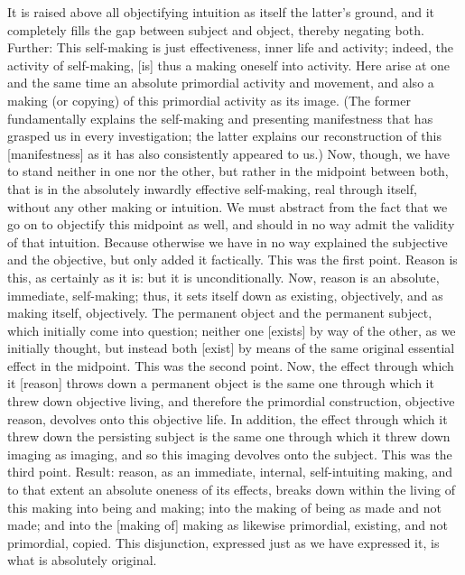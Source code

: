 It is raised above all objectifying intuition
as itself the latter’s ground,
and it completely fills the gap
between subject and object,
thereby negating both.
Further:
This self-making is just effectiveness,
inner life and activity;
indeed, the activity of self-making, [is]
thus a making oneself into activity.
Here arise at one and the same time
an absolute primordial activity and movement,
and also a making (or copying) of
this primordial activity as its image.
(The former fundamentally explains
the self-making and presenting manifestness
that has grasped us in every investigation;
the latter explains our reconstruction
of this [manifestness]
as it has also consistently appeared to us.)
Now, though, we have to stand
neither in one nor the other,
but rather in the midpoint between both,
that is in the absolutely inwardly
effective self-making,
real through itself,
without any other making or intuition.
We must abstract from the fact
that we go on to objectify
this midpoint as well,
and should in no way admit
the validity of that intuition.
Because otherwise we have in no way
explained the subjective and the objective,
but only added it factically.
This was the first point.
Reason is this, as certainly as it is:
but it is unconditionally.
Now, reason is an absolute, immediate, self-making;
thus, it sets itself down as existing, objectively,
and as making itself, objectively.
The permanent object and the permanent subject,
which initially come into question;
neither one [exists] by way of the other,
as we initially thought,
but instead both [exist] by means of
the same original essential effect in the midpoint.
This was the second point.
Now, the effect through which
it [reason] throws down a permanent object is
the same one through which it threw down objective living,
and therefore the primordial construction,
objective reason, devolves onto this objective life.
In addition, the effect through which
it threw down the persisting subject is
the same one through which it threw down imaging as imaging,
and so this imaging devolves onto the subject.
This was the third point.
Result:
reason, as an immediate, internal, self-intuiting making,
and to that extent an absolute oneness of its effects,
breaks down within the living of this making
into being and making;
into the making of being as made and not made;
and into the [making of] making
as likewise primordial, existing,
and not primordial, copied.
This disjunction, expressed just as we have expressed it,
is what is absolutely original.

